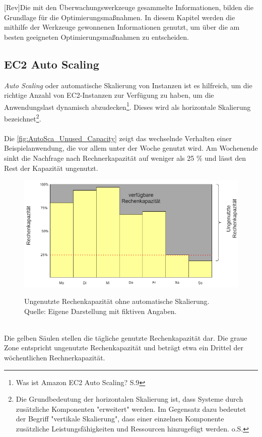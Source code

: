 [Rev]Die mit den Überwachungswerkzeuge gesammelte Informationen, bilden die Grundlage für die Optimierungsmaßnahmen. In diesem Kapitel werden die mithilfe der Werkzeuge gewonnenen Informationen genutzt, um über die am besten geeigneten Optimierungsmaßnahmen zu entscheiden.

\subsection{EC2 Auto Scaling}
\textit{Auto Scaling} oder automatische Skalierung von Instanzen ist es hilfreich, um die richtige Anzahl von EC2-Instanzen zur Verfügung zu haben, um die Anwendungslast dynamisch abzudecken\footnote{Was ist Amazon EC2 Auto Scaling? S.9\cite{AMZ31} }. Dieses wird als horizontale Skalierung bezeichnet\footnote{Die Grundbedeutung der horizontalen Skalierung ist, dass Systeme durch zusätzliche Komponenten "erweitert" werden. Im Gegensatz dazu bedeutet der Begriff "vertikale Skalierung", dass einer einzelnen Komponente zusätzliche Leistungsfähigkeiten und Ressourcen hinzugefügt werden. o.S.\cite{TECH1} }.
\\\\
Die \autoref{fig:AutoSca_Unused_Capacity} zeigt das wechselnde Verhalten einer Beispielanwendung, die vor allem unter der Woche genutzt wird. Am Wochenende sinkt die Nachfrage nach Rechnerkapazität auf weniger als 25 \% und lässt den Rest der Kapazität ungenutzt. 
\begin{figure}[h]
    \centering
    \includegraphics[scale=0.5]{sources/AutoCap Unused Capacity}
    \caption[Ungenutzte Rechenkapazität ohne automatische Skalierung]{}
    \label{fig:AutoSca_Unused_Capacity} Ungenutzte Rechenkapazität ohne automatische Skalierung. \\
    Quelle: Eigene Darstellung mit fiktiven Angaben. 
  \end{figure}\\
Die gelben Säulen stellen die tägliche genutzte Rechenkapazität dar.
Die graue Zone entspricht ungenutzte Rechenkapazität und beträgt etwa ein Drittel der wöchentlichen Rechnerkapazität.
